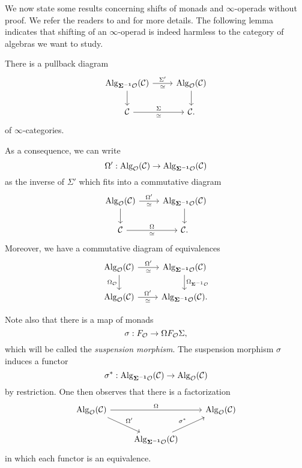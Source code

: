 We now state some results concerning shifts of monads and $\infty$-operads without proof. We refer the readers to \cite[Section 2.2.4.]{Hadrianphdthesis} and \cite{Camarena_mod2_free_spectral_Lie_algebra} for more details.
The following lemma indicates that shifting of an $\infty$-operad is indeed harmless to the category of algebras we want to study.
\begin{lemma}
\cite[Section 2.2.4.]{Hadrianphdthesis}
\label{Shift has no harm}
There is a pullback diagram
\[
    \begin{tikzcd}
	\Alg_{\bf{\Sigma}^{-1} \CO }(\CC)    & \Alg_{\CO}(\CC) \\
	 \CC & \CC
	\arrow[from=1-1, to = 1-2, "\Sigma'", "\simeq" below]
	\arrow[from=1-1 , to =2-1,  left]
	\arrow[from=1-2 , to =2-2,  right]
	\arrow[from=2-1, to=2-2, "\Sigma", "\simeq" below].
\end{tikzcd}
\]
of $\infty$-categories.
\end{lemma}
As a consequence, we can write  
$$
\Omega':
\operatorname{Alg}_{{\mathcal{O}}}({\mathcal{C}}) \to \operatorname{Alg}_{\bf{\Sigma}^{-1} {\mathcal{O}} }({\mathcal{C}})
$$
as the inverse of $\Sigma'$
which fits into a commutative diagram
\[
    \begin{tikzcd}
	\Alg_{\CO}(\CC)    & \Alg_{\bf{\Sigma}^{-1} \CO }(\CC) \\
	 \CC & \CC
	\arrow[from=1-1, to = 1-2, "\Omega'", "\simeq" below]
	\arrow[from=1-1 , to =2-1,  left]
	\arrow[from=1-2 , to =2-2,  right]
	\arrow[from=2-1, to=2-2, "\Omega", "\simeq" below].
\end{tikzcd}
\]
Moreover, we have a commutative diagram of equivalences
\begin{equation}
    \label{diagram of equivalences in shifting}
    \begin{tikzcd}
	\Alg_{\CO}(\CC)    & \Alg_{\bf{\Sigma}^{-1} \CO }(\CC) \\
	 \Alg_{\CO}(\CC) & \Alg_{\bf{\Sigma}^{-1} \CO }(\CC)
	\arrow[from=1-1, to = 1-2, "\Omega'", "\simeq" below]
	\arrow[from=1-1 , to =2-1, "\Omega_{\CO}" left]
	\arrow[from=1-2 , to =2-2, "\Omega_{\mathbf{\Sigma}^{-1} \CO}" right]
	\arrow[from=2-1, to=2-2, "\Omega'", "\simeq" below].
\end{tikzcd}
\end{equation}

Note also that there is a map of monads 
\begin{equation}
\label{suspension morphism}
    \sigma: F_{{\mathcal{O}}}\to \Omega F_{{\mathcal{O}}}\Sigma, 
\end{equation}
which will be called the \emph{suspension morphism}.  
The suspension morphism $\sigma$ induces a functor
$$
\sigma^*: \operatorname{Alg}_{\bf{\Sigma}^{-1} {\mathcal{O}} }({\mathcal{C}}) \to \operatorname{Alg}_{{\mathcal{O}} }({\mathcal{C}})
$$
by restriction. 
One then observes that there is a factorization 
\[
\begin{tikzcd}
     \Alg_{\CO}(\CC) &   & \Alg_{\CO}(\CC)\\
                     & \Alg_{\bf{\Sigma}^{-1} \CO }(\CC)  &
    \arrow[from = 1-1, to = 1-3, "\Omega"]
    \arrow[from = 1-1, to = 2-2, "\Omega'"]
    \arrow[from = 2-2, to = 1-3, "\sigma^*"]
\end{tikzcd}
\]
in which each functor is an equivalence.




